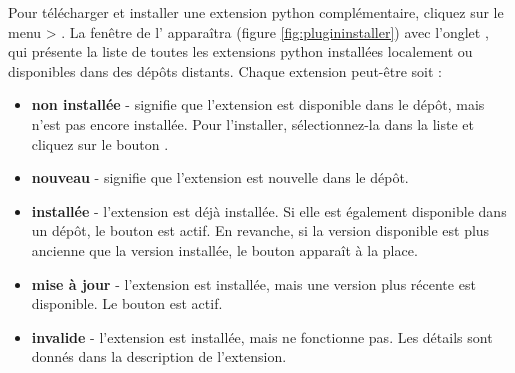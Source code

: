 Pour télécharger et installer une extension python complémentaire, cliquez sur le menu  > .
La fenêtre de l' apparaîtra (figure \ref{fig:plugininstaller}) avec l'onglet , qui présente la liste de toutes les extensions python installées localement ou disponibles dans des dépôts distants. Chaque extension peut-être soit :

\begin{itemize}
\item \textbf{non installée} - signifie que l'extension est disponible dans le dépôt, mais n'est pas encore installée. Pour l'installer, sélectionnez-la dans la liste et cliquez sur le bouton .
\item \textbf{nouveau} - signifie que l'extension est nouvelle dans le dépôt.
\item \textbf{installée} - l'extension est déjà installée. Si elle est également disponible dans un dépôt, le bouton  est actif. En revanche, si la version disponible est plus ancienne que la version installée, le bouton  apparaît à la place.
\item \textbf{mise à jour} - l'extension est installée, mais une version plus récente est disponible. Le bouton  est actif.
\item \textbf{invalide} - l'extension est installée, mais ne fonctionne pas. Les détails sont donnés dans la description de l'extension.

\end{itemize}

